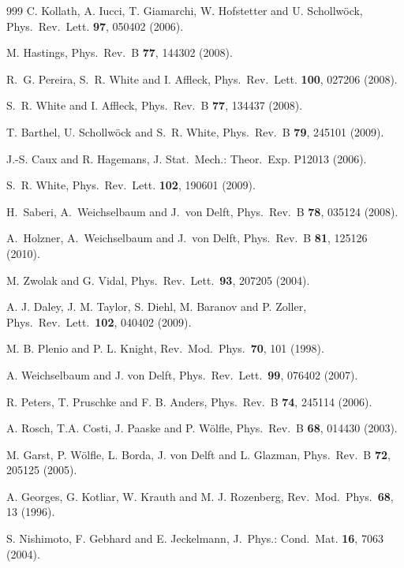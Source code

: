 \documentclass[a4paper,10pt,oneside,onecolumn,1p,times]{elsarticle}
\begin{document}
\begin{thebibliography}{999}
C. Kollath, A. Iucci, T. Giamarchi, W. Hofstetter and U. Schollw\"{o}ck, Phys.\ Rev.\ Lett. {\bf 97}, 050402 (2006).

M. Hastings, Phys.\ Rev.\ B {\bf 77}, 144302 (2008).

R.~G. Pereira, S.~R. White and I. Affleck,
Phys.\ Rev.\ Lett. {\bf 100}, 027206 (2008).

S.~R. White and I. Affleck,
Phys.\ Rev.\ B {\bf 77}, 134437 (2008).

T. Barthel, U. Schollw\"{o}ck and S.~R. White, Phys.\ Rev.\ B {\bf 79}, 245101 (2009).

J.-S. Caux and R. Hagemans, J. Stat.\ Mech.: Theor.\ Exp. P12013 (2006).

S.~R. White,
Phys.\ Rev.\ Lett. {\bf 102}, 190601 (2009).

H.~Saberi, A.~Weichselbaum and J.~von Delft, Phys.\ Rev.\ B {\bf 78}, 035124 (2008).

A.~Holzner, A.~Weichselbaum and J.~von Delft, Phys.\ Rev.\ B {\bf 81}, 125126 (2010).

M. Zwolak and G. Vidal,  Phys.\ Rev.\ Lett.\ {\bf 93}, 207205 (2004).

A. J. Daley, J. M. Taylor, S. Diehl, M. Baranov and P. Zoller, Phys.\ Rev.\ Lett.\ {\bf 102}, 040402 (2009).

M. B. Plenio and P. L. Knight, Rev.\ Mod.\ Phys.\ {\bf 70}, 101 (1998).

A. Weichselbaum and J. von Delft, Phys.\ Rev.\ Lett.\ {\bf 99}, 076402 (2007).

 R. Peters, T. Pruschke and F. B. Anders, Phys.\ Rev.\ B {\bf 74}, 245114 (2006).

A. Rosch, T.A. Costi, J. Paaske and P. W\"{o}lfle, Phys.\ Rev.\ B {\bf 68}, 014430 (2003).

M. Garst, P. W\"{o}lfle, L. Borda, J. von Delft and L. Glazman, Phys.\ Rev.\ B {\bf 72}, 205125 (2005).

 A. Georges, G. Kotliar, W. Krauth and M. J. Rozenberg, Rev.\ Mod.\ Phys.\ {\bf 68}, 13 (1996).

 S. Nishimoto, F. Gebhard and E. Jeckelmann, J.\ Phys.: Cond.\ Mat. {\bf 16}, 7063 (2004).


\end{thebibliography}
\end{document}
